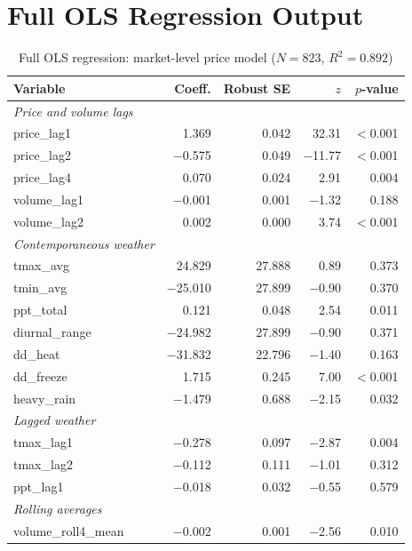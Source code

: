 \documentclass[12pt]{article}
\begin{document}
\section{Full OLS Regression Output}
\label{app:ols_full}

\begin{table}[H]
\centering
\caption{Full OLS regression: market-level price model ($N = 823$, $R^2 = 0.892$)}
\label{tab:ols_full}
\scriptsize
\begin{tabular}{lrrrr}
\toprule
Variable & Coeff. & Robust SE & $z$ & $p$-value \\
\midrule
\textit{Price and volume lags} \\
\quad price\_lag1 & 1.369 & 0.042 & 32.31 & $<$0.001 \\
\quad price\_lag2 & $-$0.575 & 0.049 & $-$11.77 & $<$0.001 \\
\quad price\_lag4 & 0.070 & 0.024 & 2.91 & 0.004 \\
\quad volume\_lag1 & $-$0.001 & 0.001 & $-$1.32 & 0.188 \\
\quad volume\_lag2 & 0.002 & 0.000 & 3.74 & $<$0.001 \\
\addlinespace
\textit{Contemporaneous weather} \\
\quad tmax\_avg & 24.829 & 27.888 & 0.89 & 0.373 \\
\quad tmin\_avg & $-$25.010 & 27.899 & $-$0.90 & 0.370 \\
\quad ppt\_total & 0.121 & 0.048 & 2.54 & 0.011 \\
\quad diurnal\_range & $-$24.982 & 27.899 & $-$0.90 & 0.371 \\
\quad dd\_heat & $-$31.832 & 22.796 & $-$1.40 & 0.163 \\
\quad dd\_freeze & 1.715 & 0.245 & 7.00 & $<$0.001 \\
\quad heavy\_rain & $-$1.479 & 0.688 & $-$2.15 & 0.032 \\
\addlinespace
\textit{Lagged weather} \\
\quad tmax\_lag1 & $-$0.278 & 0.097 & $-$2.87 & 0.004 \\
\quad tmax\_lag2 & $-$0.112 & 0.111 & $-$1.01 & 0.312 \\
\quad ppt\_lag1 & $-$0.018 & 0.032 & $-$0.55 & 0.579 \\
\addlinespace
\textit{Rolling averages} \\
\quad volume\_roll4\_mean & $-$0.002 & 0.001 & $-$2.56 & 0.010 \\

\end{tabular}
\end{table}
\end{document}

